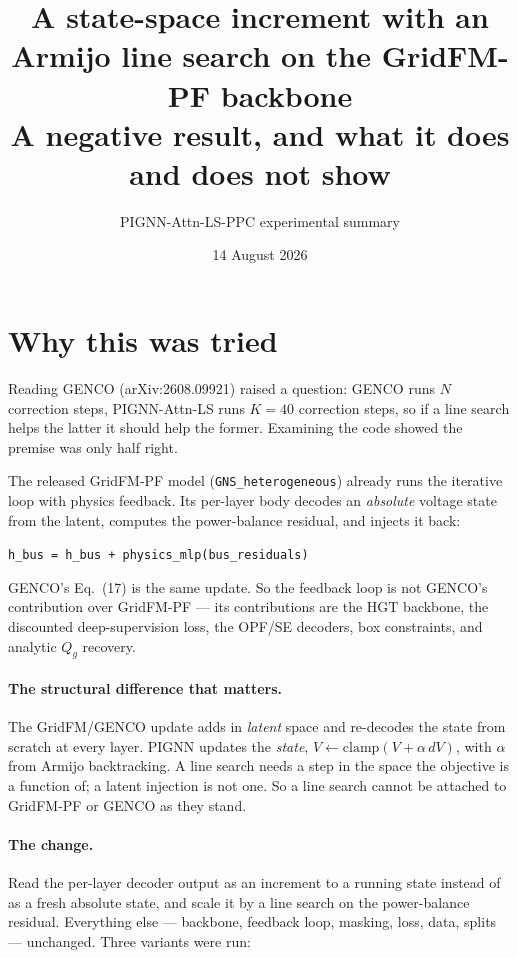 \documentclass[10pt]{article}
\title{A state-space increment with an Armijo line search on the GridFM-PF backbone\\
\large A negative result, and what it does and does not show}
\author{PIGNN-Attn-LS-PPC experimental summary}
\date{14 August 2026}
\begin{document}
\maketitle

\section{Why this was tried}

Reading GENCO (arXiv:2608.09921) raised a question: GENCO runs $N$ correction
steps, PIGNN-Attn-LS runs $K=40$ correction steps, so if a line search helps the
latter it should help the former. Examining the code showed the premise was only
half right.

The released GridFM-PF model (\texttt{GNS\_heterogeneous}) already runs the
iterative loop with physics feedback. Its per-layer body decodes an
\emph{absolute} voltage state from the latent, computes the power-balance
residual, and injects it back:

\begin{center}
\texttt{h\_bus = h\_bus + physics\_mlp(bus\_residuals)}
\end{center}

GENCO's Eq.~(17) is the same update. So the feedback loop is not GENCO's
contribution over GridFM-PF --- its contributions are the HGT backbone, the
discounted deep-supervision loss, the OPF/SE decoders, box constraints, and
analytic $Q_g$ recovery.

\paragraph{The structural difference that matters.} The GridFM/GENCO update adds
in \emph{latent} space and re-decodes the state from scratch at every layer.
PIGNN updates the \emph{state}, $V \leftarrow \mathrm{clamp}(V + \alpha\,dV)$,
with $\alpha$ from Armijo backtracking. A line search needs a step in the space
the objective is a function of; a latent injection is not one. So a line search
cannot be attached to GridFM-PF or GENCO as they stand.

\paragraph{The change.} Read the per-layer decoder output as an increment to a
running state instead of as a fresh absolute state, and scale it by a line
search on the power-balance residual. Everything else --- backbone, feedback
loop, masking, loss, data, splits --- unchanged. Three variants were run:
\end{document}
